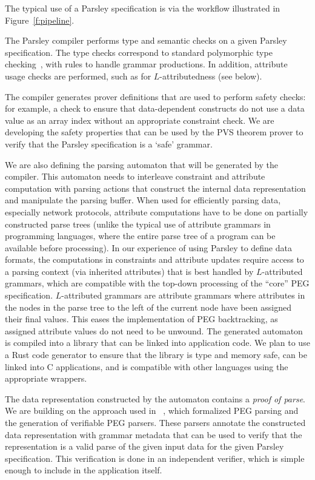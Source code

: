 \documentclass[letterpaper]{article}
\begin{document}
The typical use of a Parsley specification is via the workflow
illustrated in Figure~\ref{f:pipeline}.

The Parsley compiler performs type and semantic checks on a given
Parsley specification.  The type checks correspond to standard
polymorphic type checking~\cite{Dunfield13:bidir}\cite{zhao19:bidir},
with rules to handle grammar productions.  In addition, attribute
usage checks are performed, such as for $L$-attributedness (see
below).

The compiler generates prover definitions that are used to perform
safety checks: for example, a check to ensure that data-dependent
constructs do not use a data value as an array index without an
appropriate constraint check.  We are developing the safety properties
that can be used by the PVS theorem prover to verify that the Parsley
specification is a `safe' grammar.

We are also defining the parsing automaton that will be generated by
the compiler.  This automaton needs to interleave constraint and
attribute computation with parsing actions that construct the internal
data representation and manipulate the parsing buffer.  When used for
efficiently parsing data, especially network protocols, attribute
computations have to be done on partially constructed parse trees
(unlike the typical use of attribute grammars in programming
languages, where the entire parse tree of a program can be available
before processing).  In our experience of using Parsley to define data
formats, the computations in constraints and attribute updates require
access to a parsing context (via inherited attributes) that is best
handled by $L$-attributed grammars, which are compatible with the
top-down processing of the ``core'' PEG specification.  $L$-attributed
grammars are attribute grammars where attributes in the nodes in the
parse tree to the left of the current node have been assigned their
final values.  This eases the implementation of PEG backtracking, as
assigned attribute values do not need to be unwound.  The generated
automaton is compiled into a library that can be linked into
application code.  We plan to use a Rust code generator to ensure that
the library is type and memory safe, can be linked into C
applications, and is compatible with other languages using the
appropriate wrappers.

The data representation constructed by the automaton contains a {\em
  proof of parse}.  We are building on the approach used in
~\cite{Blaudeau_2020}, which formalized PEG parsing and the generation
of verifiable PEG parsers.  These parsers annotate the constructed
data representation with grammar metadata that can be used to verify
that the representation is a valid parse of the given input data for
the given Parsley specification.  This verification is done in an
independent verifier, which is simple enough to include in the
application itself.
\end{document}
